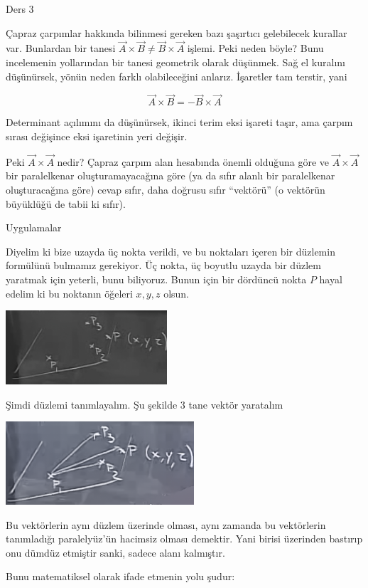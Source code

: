 \documentclass[12pt,fleqn]{article}\usepackage{../../common}
\begin{document}
Ders 3

Çapraz çarpımlar hakkında bilinmesi gereken bazı şaşırtıcı gelebilecek kurallar
var. Bunlardan bir tanesi $\vec{A} \times \vec{B} \ne \vec{B} \times \vec{A}$
işlemi. Peki neden böyle? Bunu incelemenin yollarından bir tanesi geometrik
olarak düşünmek. Sağ el kuralını düşünürsek, yönün neden farklı olabileceğini
anlarız. İşaretler tam terstir, yani

$$  \vec{A} \times \vec{B} = - \vec{B}\times \vec{A} $$

Determinant açılımını da düşünürsek, ikinci terim eksi işareti taşır, ama çarpım
sırası değişince eksi işaretinin yeri değişir.

Peki $\vec{A} \times \vec{A}$ nedir? Çapraz çarpım alan hesabında önemli
olduğuna göre ve $\vec{A} \times \vec{A}$ bir paralelkenar oluşturamayacağına
göre (ya da sıfır alanlı bir paralelkenar oluşturacağına göre) cevap sıfır, daha
doğrusu sıfır ``vektörü'' (o vektörün büyüklüğü de tabii ki sıfır).

Uygulamalar

Diyelim ki bize uzayda üç nokta verildi, ve bu noktaları içeren bir düzlemin
formülünü bulmamız gerekiyor. Üç nokta, üç boyutlu uzayda bir düzlem yaratmak
için yeterli, bunu biliyoruz. Bunun için bir dördüncü nokta $P$ hayal edelim ki
bu noktanın öğeleri $x,y,z$ olsun.

\includegraphics[width=6cm]{3_1.png}

Şimdi düzlemi tanımlayalım. Şu şekilde 3 tane vektör
yaratalım

\includegraphics[width=7cm]{3_2.png}

Bu vektörlerin aynı düzlem üzerinde olması, aynı zamanda bu vektörlerin
tanımladığı paralelyüz'ün hacimsiz olması demektir. Yani birisi üzerinden
bastırıp onu dümdüz etmiştir sanki, sadece alanı kalmıştır.

Bunu matematiksel olarak ifade etmenin yolu şudur:
\end{document}
